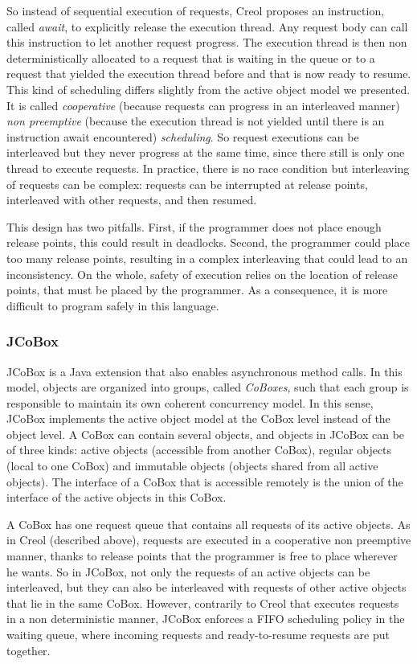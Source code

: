 \documentclass[11pt]{report}
\begin{document}
So instead of sequential execution of requests, Creol proposes an instruction, called \emph{await}, to explicitly release the execution thread. Any request body can call this instruction to let another request progress.
The execution thread is then non deterministically allocated to a request that is waiting in the queue or to a request that yielded the execution thread before and that is now ready to resume.
This kind of scheduling differs slightly from the active object model we presented. It is called \emph{cooperative} (because requests can progress in an interleaved manner) \emph{non preemptive} (because the execution thread is not yielded until there is an instruction await encountered) \emph{scheduling}. 
So request executions can be interleaved but they never progress at the same time, since there still is only one thread to execute requests. In practice, there is no race condition but interleaving of requests can be complex: requests can be interrupted at release points, interleaved with other requests, and then resumed.

This design has two pitfalls. First, if the programmer does not place enough release points, this could result in deadlocks. Second, the programmer could place too many release points, resulting in a complex interleaving that could lead to an inconsistency. On the whole, safety of execution relies on the location of release points, that must be placed by the programmer. As a consequence, it is more difficult to program safely in this language.


\subsubsection{JCoBox}\label{sec:JCoBox}
JCoBox \cite{ref:jcobox} is a Java extension that also enables asynchronous method calls. In this model, objects are organized into groups, called \emph{CoBoxes}, such that each group is responsible to maintain its own coherent concurrency model. In this sense, JCoBox implements the active object model at the CoBox level instead of the object level. A CoBox can contain several objects, and objects in JCoBox can be of three kinds: active objects (accessible from another CoBox), regular objects (local to one CoBox) and immutable objects (objects shared from all active objects). 
The interface of a CoBox that is accessible remotely is the union of the interface of the active objects in this CoBox. 

A CoBox has one request queue that contains all requests of its active objects. As in Creol (described above), requests are executed in a cooperative non preemptive manner, thanks to release points that the programmer is free to place wherever he wants.
So in JCoBox, not only the requests of an active objects can be interleaved, but they can also be interleaved with requests of other active objects that lie in the same CoBox. 
However, contrarily to Creol that executes requests in a non deterministic manner, JCoBox enforces a FIFO scheduling policy in the waiting queue, where incoming requests and ready-to-resume requests are put together. 
\end{document}
